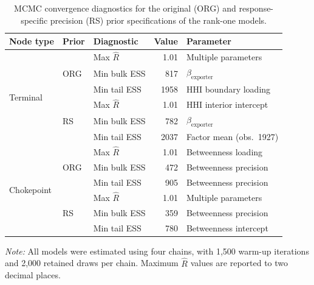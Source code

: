 \documentclass[pdftex,12pt,openright,a4paper,oneside]{book}
\begin{document}
\begin{table}[htbp]
\centering
\small
\caption{MCMC convergence diagnostics for the original
(ORG) and response-specific precision (RS) prior
specifications of the rank-one models.}
\label{tab:prior_sensitivity_diagnostics}

\begin{tabular}{lllrl}
\toprule
Node type & Prior & Diagnostic & Value & Parameter \\
\midrule

\multirow{6}{*}{Terminal}
& \multirow{3}{*}{ORG}
& Max $\widehat{R}$ & 1.01 & Multiple parameters \\
& & Min bulk ESS & 817 & $\beta_{\mathrm{exporter}}$ \\
& & Min tail ESS & 1958 & HHI boundary loading \\

\cmidrule(lr){2-5}

& \multirow{3}{*}{RS}
& Max $\widehat{R}$ & 1.01 & HHI interior intercept \\
& & Min bulk ESS & 782 & $\beta_{\mathrm{exporter}}$ \\
& & Min tail ESS & 2037 & Factor mean (obs.\ 1927) \\

\midrule

\multirow{6}{*}{Chokepoint}
& \multirow{3}{*}{ORG}
& Max $\widehat{R}$ & 1.01 & Betweenness loading \\
& & Min bulk ESS & 472 & Betweenness precision \\
& & Min tail ESS & 905 & Betweenness precision \\

\cmidrule(lr){2-5}

& \multirow{3}{*}{RS}
& Max $\widehat{R}$ & 1.01 & Multiple parameters \\
& & Min bulk ESS & 359 & Betweenness precision \\
& & Min tail ESS & 780 & Betweenness intercept \\

\bottomrule
\end{tabular}

\begin{minipage}{0.95\textwidth}
\vspace{0.2cm}
\footnotesize
\textit{Note:} All models were estimated using four
chains, with 1,500 warm-up iterations and 2,000
retained draws per chain. Maximum $\widehat{R}$
values are reported to two decimal places.
\end{minipage}

\end{table}
\end{document}
